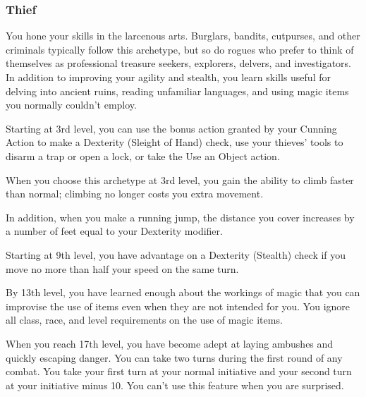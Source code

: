 \subsubsection{Thief}

You hone your skills in the larcenous arts. Burglars, bandits, cutpurses, and other criminals typically follow this archetype, but so do rogues who prefer to think of themselves as professional treasure seekers, explorers, delvers, and investigators. In addition to improving your agility and stealth, you learn skills useful for delving into ancient ruins, reading unfamiliar languages, and using magic items you normally couldn’t employ.


Starting at 3rd level, you can use the bonus action granted by your Cunning Action to make a Dexterity (Sleight of Hand) check, use your thieves’ tools to disarm a trap or open a lock, or take the Use an Object action.


When you choose this archetype at 3rd level, you gain the ability to climb faster than normal; climbing no longer costs you extra movement.

In addition, when you make a running jump, the distance you cover increases by a number of feet equal to your Dexterity modifier.


Starting at 9th level, you have advantage on a Dexterity (Stealth) check if you move no more than half your speed on the same turn.


By 13th level, you have learned enough about the workings of magic that you can improvise the use of items even when they are not intended for you. You ignore all class, race, and level requirements on the use of magic items.


When you reach 17th level, you have become adept at laying ambushes and quickly escaping danger. You can take two turns during the first round of any combat. You take your first turn at your normal initiative and your second turn at your initiative minus 10. You can’t use this feature when you are surprised.
